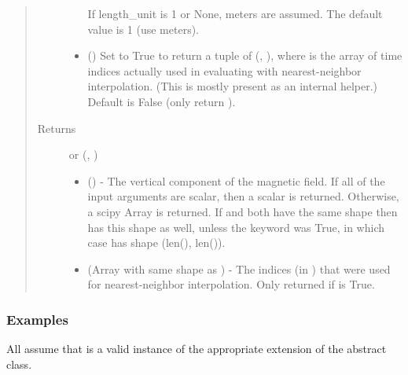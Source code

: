 \documentclass[letterpaper,10pt,english]{sphinxmanual}
\begin{document}
\begin{fulllineitems}
\begin{fulllineitems}
\begin{quote}
\begin{description}
\begin{itemize}
If length\_unit is 1 or None, meters are assumed. The default
value is 1 (use meters).


\item {} 
 () \textendash{} Set to True to return a tuple of (,
), where  is the array of time indices
actually used in evaluating  with nearest-neighbor
interpolation. (This is mostly present as an internal helper.)
Default is False (only return ).

\end{itemize}

\item[{Returns}] \leavevmode

 or (, )
\begin{itemize}
\item {} 
 () - The vertical component of the
magnetic field. If all of the input arguments are scalar, then a
scalar is returned. Otherwise, a scipy Array is returned. If 
and  both have the same shape then  has this shape as well,
unless the  keyword was True, in which case  has
shape (len(), len()).

\item {} 
 (Array with same shape as ) - The indices
(in ) that were used for
nearest-neighbor interpolation. Only returned if  is
True.

\end{itemize}


\end{description}\end{quote}
\subsubsection*{Examples}

All assume that  is a valid instance of the appropriate
extension of the {\hyperref[\detokenize{eqtools:eqtools.core.Equilibrium}]{}} abstract class.


\end{fulllineitems}
\end{fulllineitems}
\end{document}
